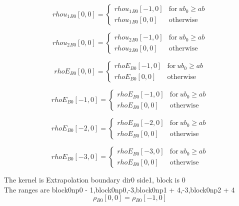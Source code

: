 \documentclass{article}
\begin{document}
\begin{dmath}{rhou_{1}{_{B0}}}[{0,0}] = \begin{cases} {rhou_{1}{_{B0}}}[{-1,0}] & \text{for}\: ub_{0} \geq ab \\{rhou_{1}{_{B0}}}[{0,0}] & \text{otherwise} \end{cases}\end{dmath}

\begin{dmath}{rhou_{2}{_{B0}}}[{0,0}] = \begin{cases} {rhou_{2}{_{B0}}}[{-1,0}] & \text{for}\: ub_{0} \geq ab \\{rhou_{2}{_{B0}}}[{0,0}] & \text{otherwise} \end{cases}\end{dmath}

\begin{dmath}{rhoE{_{B0}}}[{0,0}] = \begin{cases} {rhoE{_{B0}}}[{-1,0}] & \text{for}\: ub_{0} \geq ab \\{rhoE{_{B0}}}[{0,0}] & \text{otherwise} \end{cases}\end{dmath}

\begin{dmath}{rhoE{_{B0}}}[{-1,0}] = \begin{cases} {rhoE{_{B0}}}[{-1,0}] & \text{for}\: ub_{0} \geq ab \\{rhoE{_{B0}}}[{0,0}] & \text{otherwise} \end{cases}\end{dmath}

\begin{dmath}{rhoE{_{B0}}}[{-2,0}] = \begin{cases} {rhoE{_{B0}}}[{-2,0}] & \text{for}\: ub_{0} \geq ab \\{rhoE{_{B0}}}[{0,0}] & \text{otherwise} \end{cases}\end{dmath}

\begin{dmath}{rhoE{_{B0}}}[{-3,0}] = \begin{cases} {rhoE{_{B0}}}[{-3,0}] & \text{for}\: ub_{0} \geq ab \\{rhoE{_{B0}}}[{0,0}] & \text{otherwise} \end{cases}\end{dmath}

\noindent The kernel is Extrapolation boundary dir0 side1, block is 0\\\noindent The ranges are block0np0 - 1,block0np0,-3,block0np1 + 4,-3,block0np2 + 4\\\begin{dmath}{\rho{_{B0}}}[{0,0}] = {\rho{_{B0}}}[{-1,0}]\end{dmath}
\end{document}
